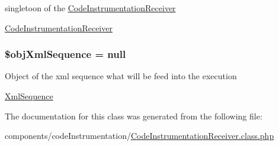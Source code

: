 singletoon of the \hyperlink{class_code_instrumentation_receiver}{CodeInstrumentationReceiver}

\hyperlink{class_code_instrumentation_receiver}{CodeInstrumentationReceiver} \hypertarget{class_code_instrumentation_receiver_eefa469c1b13fe1fec040c910b720034}{
\subsubsection[{\$objXmlSequence}]{\setlength{\rightskip}{0pt plus 5cm}\$objXmlSequence = null}}
\label{class_code_instrumentation_receiver_eefa469c1b13fe1fec040c910b720034}


Object of the xml sequence what will be feed into the execution

\hyperlink{class_xml_sequence}{XmlSequence} 

The documentation for this class was generated from the following file:\begin{CompactItemize}
\item 
components/codeInstrumentation/\hyperlink{_code_instrumentation_receiver_8class_8php}{CodeInstrumentationReceiver.class.php}\end{CompactItemize}
